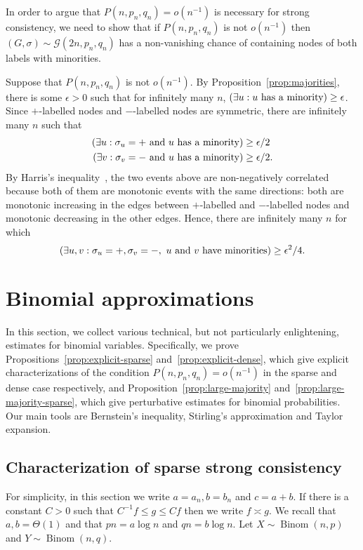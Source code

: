 \documentclass[EJP,final]{ejpecp}
\newcommand{\1}[1]{\mathbbm{1}_{\{#1\}}}
\newcommand{\calG}{\mathcal{G}}
\let\Pr\relax
\DeclareMathOperator{\Pr}{Pr}
\DeclareMathOperator{\Binom}{Binom}
\begin{document}
In order to argue that $P(n, p_n, q_n) = o(n^{-1})$ is necessary
for strong consistency, we need to show that if
$P(n, p_n, q_n)$ is not $o(n^{-1})$ then $(G, \sigma) \sim \calG(2n, p_n, q_n)$
has a non-vanishing chance of containing nodes of both labels with minorities.

Suppose that $P(n, p_n, q_n)$ is not $o(n^{-1})$. By
Proposition~\ref{prop:majorities}, there is some $\epsilon > 0$ such
that for infinitely many $n$,
$\Pr(\exists u: \text{$u$ has a minority}) \ge \epsilon$. Since $+$-labelled
nodes and $-$-labelled nodes are symmetric, there are infinitely many $n$
such that
\begin{align*}
\Pr(\exists u: \sigma_u = + \text{ and $u$ has a minority}) &\ge \epsilon / 2 \\
\Pr(\exists v: \sigma_v = - \text{ and $u$ has a minority}) &\ge \epsilon / 2.
\end{align*}
By Harris's inequality~\cite{Harris:60},
the two events above are non-negatively correlated because both
of them are monotonic events with the same directions: both are monotonic
increasing in the edges between $+$-labelled and
$-$-labelled nodes and monotonic decreasing in the other edges.
Hence, there are infinitely many $n$ for which
\[
\Pr(\exists u, v: \sigma_u = +, \sigma_v = -, \text{ $u$ and $v$ have minorities})
\ge \epsilon^2 / 4.
\]

\section{Binomial approximations}\label{sec:binomial}

In this section, we collect various technical, but not particularly
enlightening, estimates for binomial variables.
Specifically, we prove Propositions~\ref{prop:explicit-sparse}
and~\ref{prop:explicit-dense}, which give explicit characterizations
of the condition $P(n, p_n, q_n) = o(n^{-1})$ in the sparse and dense case respectively,
and Proposition~\ref{prop:large-majority} and~\ref{prop:large-majority-sparse},
which give perturbative estimates for binomial probabilities.
Our main tools are
Bernstein's inequality, Stirling's approximation and Taylor expansion.

\subsection{Characterization of sparse strong consistency}

For simplicity, in this section we write $a = a_n, b = b_n$ and $c = a + b$.
If there is a constant $C > 0$ such that $C^{-1} f \le g \le C f$ then we
write $f \asymp g$. We recall that $a, b = \Theta(1)$ and that $p n = a \log n$
and $q n = b \log n$.
Let $X \sim \Binom(n, p)$ and $Y \sim \Binom(n, q)$.
\end{document}
